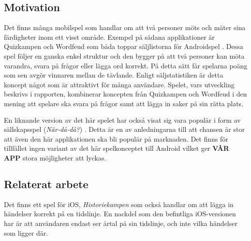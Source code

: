 \documentclass[a4paper, 11pt]{article}
\begin{document}
\subsection{Motivation}
Det finns många mobilspel som handlar om att två personer möts och mäter sina färdigheter inom ett visst område. Exempel på sådana applikationer är Quizkampen och Wordfeud som båda toppar säljlistorna för Androidspel \cite{appsalesrating}. Dessa spel följer en ganska enkel struktur och den bygger på att två personer kan möta varandra, svara på frågor eller lägga ord korrekt. På detta sätt får spelarna poäng som sen avgör vinnaren mellan de tävlande. Enligt säljstatistiken \cite{appsalesrating} är detta koncept något som är attraktivt för många användare. Spelet, vars utveckling beskrivs i rapporten, kombinerar koncepten från Quizkampen och Wordfeud i den mening att spelare ska svara på frågor samt att lägga in saker på sin rätta plats. 

En liknande version av det här spelet har också visat sig vara populär i form av sällskapsspel (\textit{När-då-då?}) \cite{nardada}. Detta är en av anledningarna till att chansen är stor att även den här applikationen ska bli populär på marknaden. Det finns för tillfället ingen variant av det här spelkonceptet till Android vilket ger \textbf{VÅR APP} stora möjligheter att lyckas.

\subsection{Relaterat arbete}
Det finns ett spel för iOS, \textit{Historiekampen} \cite{historiekampen} som också handlar om att lägga in händelser korrekt på en tidslinje. En nackdel som den befintliga iOS-versionen har är att användaren endast ser årtal på sin tidslinje, och inte vilka händelser som ligger där.
\end{document}

